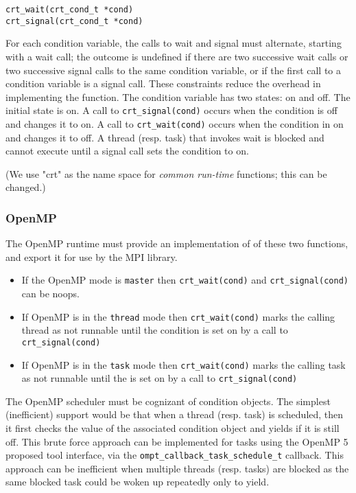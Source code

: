 \documentclass[twoside,11pt]{article}
\begin{document}
\texttt{crt\_wait(crt\_cond\_t *cond)}
\\
\texttt{crt\_signal(crt\_cond\_t *cond)}

For each condition variable, the calls to wait and signal must alternate, 
starting with a 
wait call; the outcome is undefined if there are two successive wait calls 
or two successive signal calls to the same condition variable, or if the first 
call to a condition variable
is a signal call. 
These constraints reduce the overhead in implementing the function.
The condition variable  has two states: on and off. The initial state is 
on. A call to 
\texttt{crt\_signal(cond)} occurs when the condition is off  and changes it 
to 
on. A call 
to 
\texttt{crt\_wait(cond)} occurs when the condition in on
and changes it to off. 
A thread (resp. task) that invokes wait is blocked and cannot execute until a 
signal call sets the condition to on.

 (We use "crt" as the name space for \emph{common run-time} functions; this can 
 be changed.)
	
\subsubsection{OpenMP}

The OpenMP runtime must provide an implementation of of these two functions, 
and export it for use by the MPI library.

\begin{itemize}
	\item 
If the OpenMP mode is \texttt{master} then \texttt{crt\_wait(cond)}  and
\texttt{crt\_signal(cond)} can be noops. 
\item
If OpenMP is in the \texttt{thread} mode then \texttt{crt\_wait(cond)}  marks 
the calling thread as not runnable until the condition is set on by a call to 
\texttt{crt\_signal(cond)}
\item
If OpenMP is in the \texttt{task} mode then \texttt{crt\_wait(cond)}  marks 
the calling task as not runnable until the is set on by a call to 
\texttt{crt\_signal(cond)}
\end{itemize}	
 
The OpenMP scheduler must be cognizant of condition objects. The simplest 
(inefficient) support would be that when a thread (resp. task) is scheduled, 
then it first checks the value of the associated condition object and yields if 
it is 
still 
off. This brute force approach can be implemented for tasks using the 
OpenMP 5 
proposed tool interface, via the \texttt{ompt\_callback\_task\_schedule\_t} 
callback. This approach can be inefficient when multiple threads (resp. tasks) 
are blocked as the same blocked task could be woken up repeatedly only to yield.
\end{document}
